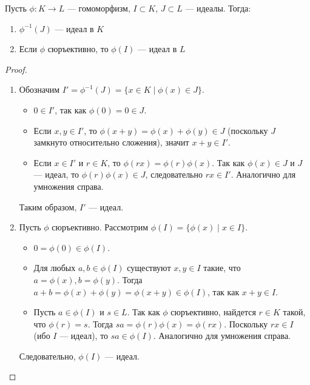 \begin{proposition}
    Пусть \(\phi: K \rightarrow L\) --- гомоморфизм, \(I \subset K\), \(J \subset L\) --- идеалы. Тогда:
    \begin{enumerate}
        \item \(\phi^{-1}(J)\) --- идеал в \(K\)
        \item Если \(\phi\) сюръективно, то \(\phi(I)\) --- идеал в \(L\)
    \end{enumerate}
\end{proposition}
\begin{proof}
    \begin{enumerate}
        \item Обозначим \(I' = \phi^{-1}(J) = \{x \in K \mid \phi(x) \in J\}\).
        \begin{itemize}
            \item \(0 \in I'\), так как \(\phi(0)=0 \in J\).
            \item Если \(x, y \in I'\), то \(\phi(x+y) = \phi(x)+\phi(y) \in J\) (поскольку \(J\) замкнуто относительно сложения), значит \(x+y \in I'\).
            \item Если \(x \in I'\) и \(r \in K\), то \(\phi(rx) = \phi(r)\phi(x)\). Так как \(\phi(x) \in J\) и \(J\) --- идеал, то \(\phi(r)\phi(x) \in J\), следовательно \(rx \in I'\). Аналогично для умножения справа.
        \end{itemize}
        Таким образом, \(I'\) --- идеал.

        \item Пусть \(\phi\) сюръективно. Рассмотрим \(\phi(I) = \{\phi(x) \mid x \in I\}\).
        \begin{itemize}
            \item \(0 = \phi(0) \in \phi(I)\).
            \item Для любых \(a, b \in \phi(I)\) существуют \(x, y \in I\) такие, что \(a = \phi(x), b = \phi(y)\). Тогда \(a+b = \phi(x)+\phi(y) = \phi(x+y) \in \phi(I)\), так как \(x+y \in I\).
            \item Пусть \(a \in \phi(I)\) и \(s \in L\). Так как \(\phi\) сюръективно, найдется \(r \in K\) такой, что \(\phi(r) = s\). Тогда \(sa = \phi(r)\phi(x) = \phi(rx)\). Поскольку \(rx \in I\) (ибо \(I\) --- идеал), то \(sa \in \phi(I)\). Аналогично для умножения справа.
        \end{itemize}
        Следовательно, \(\phi(I)\) --- идеал.
    \end{enumerate}
\end{proof}

